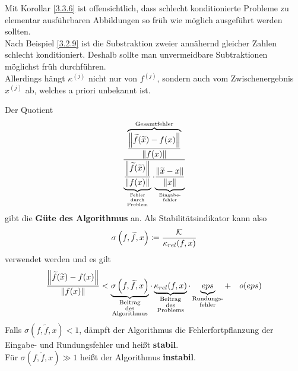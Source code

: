 \begin{Beme}
  Mit Korollar \ref{3.3.6} ist offensichtlich, dass schlecht konditionierte Probleme 
  zu elementar ausführbaren Abbildungen so früh wie möglich ausgeführt werden sollten. \\
  Nach Beispiel \ref{3.2.9} ist die Substraktion zweier annähernd gleicher Zahlen schlecht konditioniert.
  Deshalb sollte man unvermeidbare Subtraktionen möglichst früh durchführen. \\
  Allerdings hängt $\kappa^{(j)}$ nicht nur von $f^{(j)}$, sondern auch vom 
  Zwischenergebnis $x^{(j)}$ ab, welches a priori unbekannt ist.
\end{Beme}

\begin{Beme}[Sprechweise]\label{3.3.8}
  Der Quotient 
  \begin{gather}
    \frac{\overbrace{\frac{\left\| \widetilde{f}(\widetilde{x})-f(x) \right\|}{\left\| f(x) \right\|}}^{
        \text{Gesamtfehler}}}
    {\underbrace{\frac{\left\| \widetilde{f}(\widetilde{x}) \right\|}{\left\| f(x) \right\|}}_{
        \scriptsize\substack{
          \text{Fehler} \\
          \text{durch} \\
          \text{Problem}
        }}
      \cdot
      {\underbrace{\frac{\left\| \widetilde{x}-x \right\|}{\left\| x \right\|}}_{
          \scriptsize\substack{\text{Eingabe-} \\ \text{fehler}}}}}
    \label{III.3.6}
  \end{gather}
  gibt die \textbf{Güte des Algorithmus}  an.
  Als Stabilitätsindikator kann also 
  \begin{gather}
    \sigma\left(f, \widetilde{f}, x\right) \coloneqq \frac{\mathcal{K}}{\kappa_{rel}(f, x)}
    \label{III.3.7}
  \end{gather}
  verwendet werden und es gilt
  \begin{gather*}
    \frac{\left\| \widetilde{f}(\widetilde{x})-f(x) \right\|}{\left\| f(x) \right\|}
    < \underbrace{\sigma\left( f,\widetilde{f}, x\right) }_{
      \substack{\text{Beitrag}\\
        \text{des} \\
        \text{Algorithmus}}}
    \cdot \underbrace{\kappa_{rel}(f,x)}_{
      \substack{\text{Beitrag} \\
        \text{des} \\
        \text{Problems}}}
    \cdot \underbrace{eps}_{\substack{\text{Rundungs-}\\\text{fehler}}}
    + \quad o(eps)
  \end{gather*}
  Falls $\sigma( f,\widetilde{f}, x)  < 1$, dämpft der Algorithmus die Fehlerfortpflanzung der Eingabe- und Rundungsfehler und heißt \textbf{stabil}. \\
  Für $\sigma( f,\widetilde{f}, x)  \gg 1$ heißt der Algorithmus \textbf{instabil}.
\end{Beme}



